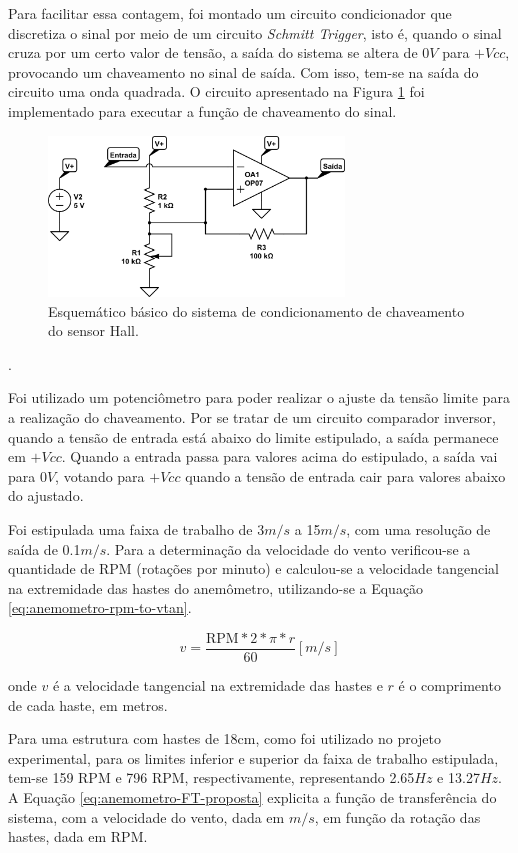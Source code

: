 \documentclass[a4paper]{instrumentacao}
\begin{document}
Para facilitar essa contagem, foi montado um circuito condicionador que discretiza o sinal por meio de um circuito \textit{Schmitt Trigger}, isto é, quando o sinal cruza por um certo valor de tensão, a saída do sistema se altera de 0$V$ para $+Vcc$, provocando um chaveamento no sinal de saída. Com isso, tem-se na saída do circuito uma onda quadrada. O circuito apresentado na Figura \ref{fig:hall-circuito} foi implementado para executar a função de chaveamento do sinal. 

\begin{figure}[H]
	\centering \includegraphics[width=0.7\textwidth]{hall-circuito.png}
	\caption{Esquemático básico do sistema de condicionamento de chaveamento do sensor Hall.}
	\label{fig:hall-circuito}
\end{figure}.

Foi utilizado um potenciômetro para poder realizar o ajuste da tensão limite para a realização do chaveamento. Por se tratar de um circuito comparador inversor, quando a tensão de entrada está abaixo do limite estipulado, a saída permanece em $+Vcc$. Quando a entrada passa para valores acima do estipulado, a saída vai para 0$V$, votando para $+Vcc$ quando a tensão de entrada cair para valores abaixo do ajustado.

Foi estipulada uma faixa de trabalho de 3$m/s$ a 15$m/s$, com uma resolução de saída de 0.1$m/s$. Para a determinação da velocidade do vento verificou-se a quantidade de RPM (rotações por minuto) e calculou-se a velocidade tangencial na extremidade das hastes do anemômetro, utilizando-se a Equação \ref{eq:anemometro-rpm-to-vtan}.

\begin{equation}
	v=\frac{\mathrm{RPM}*2*\pi*r}{60}[m/s]
	\label{eq:anemometro-rpm-to-vtan}
\end{equation}

\noindent onde $v$ é a velocidade tangencial na extremidade das hastes e $r$ é o comprimento de cada haste, em metros.

Para uma estrutura com hastes de 18cm, como foi utilizado no projeto experimental, para os limites inferior e superior da faixa de trabalho estipulada, tem-se 159 RPM e 796 RPM, respectivamente, representando 2.65$Hz$ e 13.27$Hz$. A Equação \ref{eq:anemometro-FT-proposta} explicita a função de transferência do sistema, com a velocidade do vento, dada em $m/s$, em função da rotação das hastes, dada em RPM.
\end{document}

